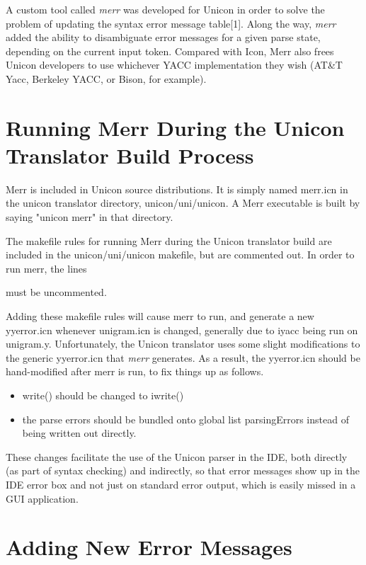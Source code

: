 \documentclass[letterpaper]{article}
\begin{document}
A custom tool called {\em merr\/} was developed for Unicon in order to
solve the problem of updating the syntax error message table[1].  Along
the way, {\em merr\/} added the ability to disambiguate error
messages for a given parse state, depending on the current input token.
Compared with Icon, Merr also frees Unicon developers to use whichever
YACC implementation they wish (AT\&T Yacc, Berkeley YACC, or Bison,
for example).

\section{Running Merr During the Unicon Translator Build Process}

Merr is included in Unicon source distributions. It is simply named
merr.icn in the unicon translator directory, unicon/uni/unicon.
A Merr executable is built by saying "unicon merr" in that directory.

The makefile rules for running Merr during the Unicon translator build
are included in the unicon/uni/unicon makefile, but are commented out.
In order to run merr, the lines


\noindent must be uncommented.

Adding these makefile rules will cause merr to run, and generate a new
yyerror.icn whenever unigram.icn is changed, generally due to iyacc
being run on unigram.y.  Unfortunately, the Unicon translator uses
some slight modifications to the generic yyerror.icn that {\em merr\/}
generates. As a result, the yyerror.icn should be hand-modified after
merr is run, to fix things up as follows.

\begin{itemize}
\item write() should be changed to iwrite()
\item the parse errors should be bundled onto global list
      parsingErrors instead of being written out directly.
\end{itemize}

These changes facilitate the use of the Unicon parser in the IDE, both
directly (as part of syntax checking) and indirectly, so that error
messages show up in the IDE error box and not just on standard error
output, which is easily missed in a GUI application.

\section{Adding New Error Messages}
\end{document}
